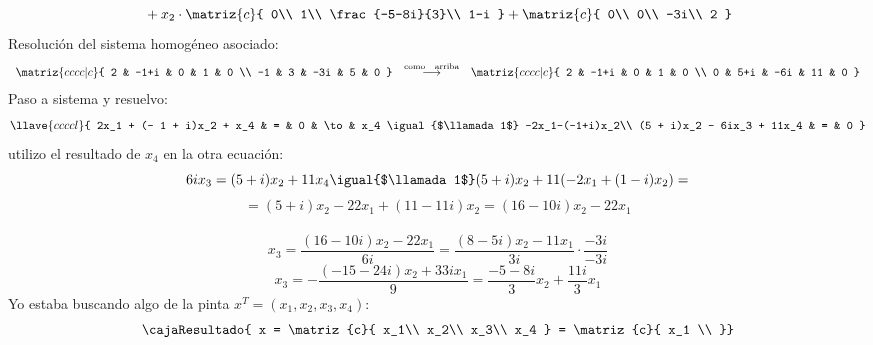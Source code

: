 \begin{enumerate}[label=(\alph*)]
$${{            }
            +
            x_2 \cdot
            \matriz{c}{
              0\\
              1\\
              \frac{-5-8i}{3}\\
              1-i
            }
            +
            \matriz{c}{
              0\\
              0\\
              -3i\\
              2
            }
          }
        $$
        Resolución del sistema homogéneo asociado:
        $$
          \begin{array}{ccc}
            \matriz{cccc|c}{
             2   &  -1+i  &  0    &   1   &   0        \\
            -1   &    3   & -3i   &   5   &   0
            }
              &
            \overset{\text{como \hspace{0.1cm} arriba}}{\longrightarrow}
              &
            \matriz{cccc|c}{
            2   &  -1+i    &    0   &   1    &  0         \\
            0   &   5+i    &   -6i  &   11   &  0
            }                                                    \\
          \end{array}
        $$
        Paso a sistema y resuelvo:
        $$
          \llave{ccccl}{
            2x_1  + (- 1 + i)x_2 + x_4  & = & 0 & \to & x_4 \igual{$\llamada1$} -2x_1-(-1+i)x_2\\
            (5 + i)x_2  - 6ix_3 + 11x_4  & = & 0  
          }
        $$
        utilizo el resultado de $x_4$ en la otra ecuación:
        $$
        6ix_3 = (5+i)x_2+11x_4 \igual{$\llamada1$} (5+i)x_2+11(-2x_1+(1-i)x_2)= 
        $$
        $$
        =(5+i)x_2-22x_1+(11-11i)x_2 = (16-10i)x_2-22x_1
        $$
        \\
        $$
        x_3 = \frac{(16-10i)x_2-22x_1}{6i} = \frac{(8-5i)x_2-11x_1}{3i} \cdot \frac{-3i}{-3i}
        $$
        $$
        x_3= -\frac{(-15-24i)x_2+33ix_1}{9} = \frac{-5-8i}{3}x_2 + \frac{11i}{3}x_1
        $$
        Yo estaba buscando algo de la pinta  $x^T = (x_1, x_2, x_3, x_4)$:
        $$
          \cajaResultado{
            x = \matriz{c}{
              x_1\\
              x_2\\
              x_3\\
              x_4
            }
            =
            \matriz{c}{
              x_1 \\
}}$$
\end{enumerate}
